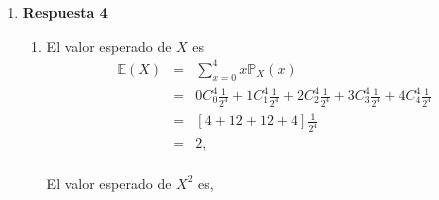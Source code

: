 \documentclass[a4paper,9pt]{report}
\begin{document}
\begin{enumerate}
Sea A el evento en el que al menos $(n - 1)$ de las monedas de las $n$ monedas muestren todas las caras o todo sellos  y sea B el evento de que todas las $n$ monedas muestren todas caras o todas sellos. Entonces, se pide  encontrar el valor num\'erico de,


\[
\mathbb{P}(B|A) = \frac{\mathbb{P}(A \cap B)}{\mathbb{P}(A)}.
\]

Ahora,

\[
\mathbb{P}(A \cap B) = \mathbb{P}(B) = \biggl (\frac{1}{2}\biggr)^n +  \biggl (\frac{1}{2}\biggr)^{n} =  \biggl (\frac{1}{2}\biggr)^{n -1}.
\]

Adem\'as, el evento A ocurrir\'a si se obtienen exactamente $(n-1)$ caras, o si se obtienen exactamente $(n- 1)$ sellos, o si se obtienen exactamente $n$ caras, o si se obtienen exactamente $n$ sellos, de modo que

\[
\mathbb{P}(A) =  n\biggl (\frac{1}{2}\biggr)^n +  n\biggl (\frac{1}{2}\biggr)^{n} +  \biggl (\frac{1}{2}\biggr)^{n} +  \biggl (\frac{1}{2}\biggr)^{n -1}=  (1 + n)\biggl (\frac{1}{2}\biggr)^{n -1}.
\]

As\'i,

\[
\mathbb{P}(B|A) = \frac{(1/2)^{n -1}}{(1 +n)(1/2)^{n -1}} = \frac{1}{n + 1}, \quad n =3, 4,\dots, \infty.
\]

\item [] \textbf{Respuesta 4}

\begin{enumerate}
	\item  El valor esperado de $X$ es
	\begin{eqnarray*}
		\mathbb{E}(X)&=&\displaystyle \sum_{x=0}^{4}x\mathbb{P}_X(x)\\
		&=&0C_0^4\frac{1}{2^4}+1C_1^4\frac{1}{2^4}+2C_2^4\frac{1}{2^4}+3C_3^4\frac{1}{2^4}+4C_4^4\frac{1}{2^4}\\
		&=&[4+12+12+4]\frac{1}{2^4}\\
		&=& 2,
	\end{eqnarray*}
	\\
	El valor esperado de $X^2$ es,
	

\end{enumerate}
\end{enumerate}
\end{document}
